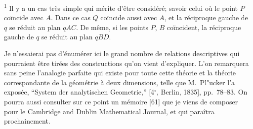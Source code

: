 \documentclass[11pt,a4paper]{article}
\theoremstyle{definition}
\begin{document}
\small
\textsuperscript{1} Il y a un cas tr\`{e}s simple qui m\'{e}rite d'\^{e}tre consid\'{e}r\'{e}; savoir celui o\`{u} le point $P$ co\"{i}ncide avec $A$. Dans ce cas $Q$ co\"{i}ncide aussi avec $A$, et la r\'{e}ciproque gauche de $q$ se r\'{e}duit au plan $qAC$. De m\^{e}me, si les points $P$, $B$ co\"{i}ncident, la r\'{e}ciproque gauche de $q$ se r\'{e}duit au plan $qBD$.
\normalsize

\newpage

\setcounter{page}{418}

Je n'essaierai pas d'\'{e}num\'{e}rer ici le grand nombre de relations descriptives qui pourraient \^{e}tre tir\'{e}es des constructions qu'on vient d'expliquer. L'on remarquera sans peine l'analogie parfaite qui existe pour toute cette th\'{e}orie et la th\'{e}orie correspondante de la g\'{e}om\'{e}trie \`{a} deux dimensions, telle que M.~Pl"{u}cker l'a expos\'{e}e, ``System der analytischen Geometrie,'' [4$^{\circ}$, Berlin, 1835], pp.~78--83. On pourra aussi consulter sur ce point un m\'{e}moire [61] que je viens de composer pour le Cambridge and Dublin Mathematical Journal, et qui para\^{i}tra prochainement.
\end{document}

